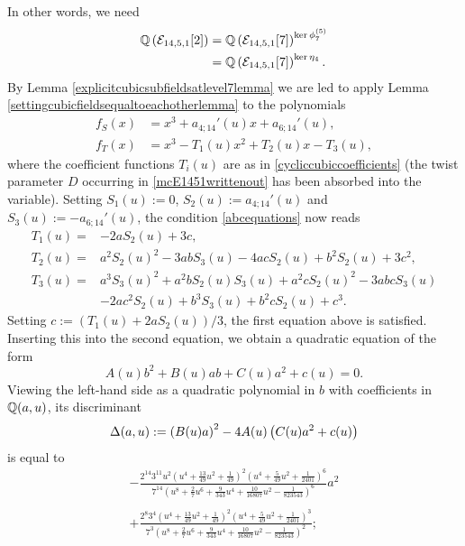 In other words, we need 
\[
\begin{split}
\mathbb{Q}\left( \mathcal{E}_{14,5,1}[2] \right) &= \mathbb{Q}\left(\mathcal{E}_{14,5,1}[7] \right)^{\ker \phi_7^{(5)}} \\
&= \mathbb{Q}\left(\mathcal{E}_{14,5,1}[7] \right)^{\ker \eta_4}.
\end{split}
\]
By Lemma \ref{explicitcubicsubfieldsatlevel7lemma} we are led to apply Lemma \ref{settingcubicfieldsequaltoeachotherlemma} to the polynomials
\[
\begin{split}
f_S(x) &= x^3 + a_{4;14}'(u) x + a_{6;14}'(u), \\
f_T(x) &= x^3 - T_1(u) x^2 + T_2(u) x - T_3(u),
\end{split}
\]
where the coefficient functions $T_i(u)$ are as in \eqref{cycliccubiccoefficients} (the twist parameter $D$ occurring in \eqref{mcE1451writtenout} has been absorbed into the variable). Setting $S_1(u) := 0$, $S_2(u) := a_{4;14}'(u)$ and $S_3(u) := -a_{6;14}'(u)$, the condition \eqref{abcequations} now reads
\begin{equation} \label{newabcequations}
\begin{split}
T_1(u) = &-2a S_2(u) + 3c, \\
T_2(u) = &a^2 S_2(u)^2 - 3abS_3(u) - 4acS_2(u) + b^2 S_2(u) + 3c^2, \\
T_3(u) = &a^3 S_3(u)^2 + a^2b S_2(u) S_3(u) + a^2c S_2(u)^2 - 3abc S_3(u) \\
& - 2ac^2 S_2(u) + b^3 S_3(u) + b^2 c S_2(u) + c^3.
\end{split}
\end{equation}
Setting $c := (T_1(u) + 2aS_2(u))/3$, the first equation above is satisfied. Inserting this into the second equation, we obtain a quadratic equation of the form
\begin{equation} \label{secondequationconic}
A(u) b^2 + B(u) ab + C(u)a^2 + c(u) = 0.
\end{equation}
Viewing the left-hand side as a quadratic polynomial in $b$ with coefficients in $\mathbb{Q}(a,u)$, its discriminant 
\[
\Delta(a,u) := \left( B(u) a \right)^2 - 4A(u) \left( C(u)a^2 + c(u) \right)
\]
is equal to
\begin{equation} \label{originaldiscriminant}
\begin{split}
-\frac{2^{14}3^{11} u^2\left( u^4 + \frac{13}{49}u^2 + \frac{1}{49} \right)^2\left(u^4 + \frac{5}{49}u^2 + \frac{1}{2401}\right)^6}{7^{14} \left(u^8 + \frac{2}{7}u^6 + \frac{9}{343}u^4 + \frac{10}{16807}u^2 - \frac{1}{823543} \right)^6} a^2 \\ \\+ \frac{2^{8}3^{4} \left( u^4 + \frac{13}{49}u^2 + \frac{1}{49} \right)^2 \left( u^4 + \frac{5}{49}u^2 + \frac{1}{2401} \right)^3}{7^{3} \left(u^8 + \frac{2}{7}u^6 + \frac{9}{343}u^4 + \frac{10}{16807}u^2 - \frac{1}{823543} \right)^2};
\end{split}
\end{equation}
